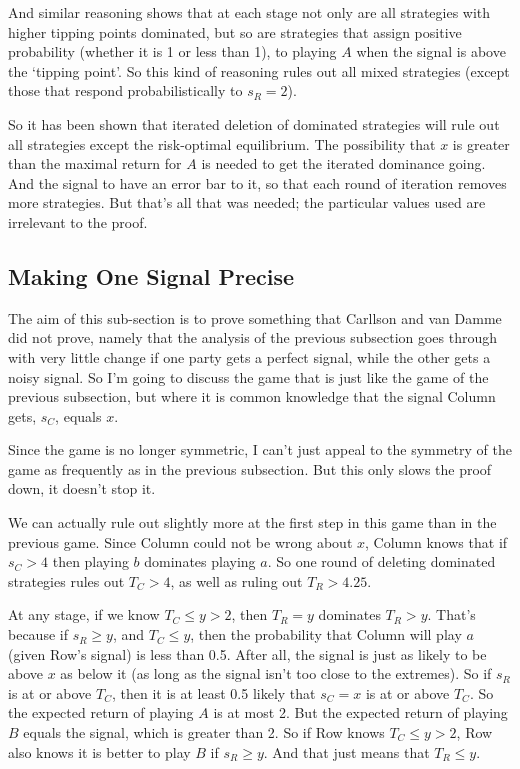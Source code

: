 \documentclass[11pt,]{book}
\begin{document}
And similar reasoning shows that at each stage not only are all strategies with higher tipping points dominated, but so are strategies that assign positive probability (whether it is 1 or less than 1), to playing \(A\) when the signal is above the `tipping point'. So this kind of reasoning rules out all mixed strategies (except those that respond probabilistically to \(s_R = 2\)).

So it has been shown that iterated deletion of dominated strategies will rule out all strategies except the risk-optimal equilibrium. The possibility that \(x\) is greater than the maximal return for \(A\) is needed to get the iterated dominance going. And the signal to have an error bar to it, so that each round of iteration removes more strategies. But that's all that was needed; the particular values used are irrelevant to the proof.

\hypertarget{perfectri}{%
\subsection{Making One Signal Precise}\label{perfectri}}

The aim of this sub-section is to prove something that Carllson and van Damme did not prove, namely that the analysis of the previous subsection goes through with very little change if one party gets a perfect signal, while the other gets a noisy signal. So I'm going to discuss the game that is just like the game of the previous subsection, but where it is common knowledge that the signal Column gets, \(s_C\), equals \(x\).

Since the game is no longer symmetric, I can't just appeal to the symmetry of the game as frequently as in the previous subsection. But this only slows the proof down, it doesn't stop it.

We can actually rule out slightly more at the first step in this game than in the previous game. Since Column could not be wrong about \(x\), Column knows that if \(s_C > 4\) then playing \(b\) dominates playing \(a\). So one round of deleting dominated strategies rules out \(T_C > 4\), as well as ruling out \(T_R > 4.25\).

At any stage, if we know \(T_C \leq y > 2\), then \(T_R = y\) dominates \(T_R > y\). That's because if \(s_R \geq y\), and \(T_C \leq y\), then the probability that Column will play \(a\) (given Row's signal) is less than 0.5. After all, the signal is just as likely to be above \(x\) as below it (as long as the signal isn't too close to the extremes). So if \(s_R\) is at or above \(T_C\), then it is at least 0.5 likely that \(s_C = x\) is at or above \(T_C\). So the expected return of playing \(A\) is at most 2. But the expected return of playing \(B\) equals the signal, which is greater than 2. So if Row knows \(T_C \leq y > 2\), Row also knows it is better to play \(B\) if \(s_R \geq y\). And that just means that \(T_R \leq y\).
\end{document}
